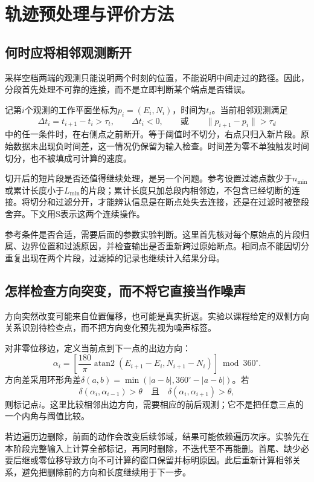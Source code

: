 \section{轨迹预处理与评价方法}
\label{sec:method}

\subsection{何时应将相邻观测断开}
采样空档两端的观测只能说明两个时刻的位置，不能说明中间走过的路径。因此，分段首先处理不可靠的连接，而不是立即判断某个端点是否错误。

记第$i$个观测的工作平面坐标为$p_i=(E_i,N_i)$，时间为$t_i$。当前相邻观测满足
\[
\Delta t_i=t_{i+1}-t_i>\tau_t,\qquad
\Delta t_i<0,\qquad\text{或}\qquad
\|p_{i+1}-p_i\|>\tau_d
\]
中的任一条件时，在右侧点之前断开。等于阈值时不切分，右点只归入新片段。原始数据未出现负时间差，这一情况仍保留为输入检查。时间差为零不单独触发时间切分，也不被填成可计算的速度。

切开后的短片段是否还值得继续处理，是另一个问题。参考设置过滤点数少于$n_{\min}$或累计长度小于$L_{\min}$的片段；累计长度只加总段内相邻边，不包含已经切断的连接。将切分和过滤分开，才能辨认信息是在断点处失去连接，还是在过滤时被整段舍弃。下文用S表示这两个连续操作。

参考条件是否合适，需要后面的参数实验判断。这里首先核对每个原始点的片段归属、边界位置和过滤原因，并检查输出是否重新跨过原始断点。相同点不能因切分重复出现在两个片段，过滤掉的记录也继续计入结果分母。

\subsection{怎样检查方向突变，而不将它直接当作噪声}
方向突然改变可能来自位置偏移，也可能是真实折返。实验以课程给定的双侧方向关系\cite{teacher}识别待检查点，而不把方向变化预先视为噪声标签。

对非零位移边，定义当前点到下一点的出边方向：
\[
\alpha_i=\left[\frac{180}{\pi}\operatorname{atan2}(E_{i+1}-E_i,N_{i+1}-N_i)\right]\bmod 360^\circ.
\]
方向差采用环形角差$\delta(a,b)=\min(|a-b|,360^\circ-|a-b|)$。若
\[
\delta(\alpha_i,\alpha_{i-1})>\theta
\quad\text{且}\quad
\delta(\alpha_i,\alpha_{i+1})>\theta,
\]
则标记点$i$。这里比较相邻出边方向，需要相应的前后观测；它不是把任意三点的一个内角与阈值比较。

若边遍历边删除，前面的动作会改变后续邻域，结果可能依赖遍历次序。实验先在本阶段完整输入上计算全部标记，再同时删除，不迭代至不再能删。首尾、缺少必要后继或零位移导致方向不可计算的窗口保留并标明原因。此后重新计算相邻关系，避免把删除前的方向和长度继续用于下一步。

